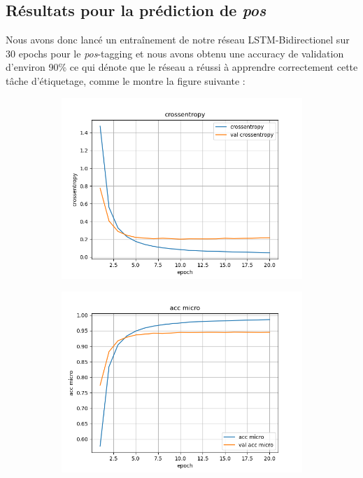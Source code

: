\documentclass[a4paper]{article}
\begin{document}
\subsection{Résultats pour la prédiction de \textit{pos}}
Nous avons donc lancé un entraînement de notre réseau LSTM-Bidirectionel sur 30 epochs pour le \textit{pos}-tagging et 
nous avons obtenu une accuracy de validation d'environ 90\% ce qui dénote que le réseau a réussi à apprendre 
correctement cette tâche d'étiquetage, comme le montre la figure suivante :

\begin{figure}[H]
    \centering
    \begin{subfigure}{0.32\textwidth}
        \centering
        \includegraphics[width=\linewidth]{../logs/get_pos/crossentropy.png}
    \end{subfigure}
    \begin{subfigure}{0.32\textwidth}
        \centering
        \includegraphics[width=\linewidth]{../logs/get_pos/acc micro.png}

\end{subfigure}
\end{figure}
\end{document}
